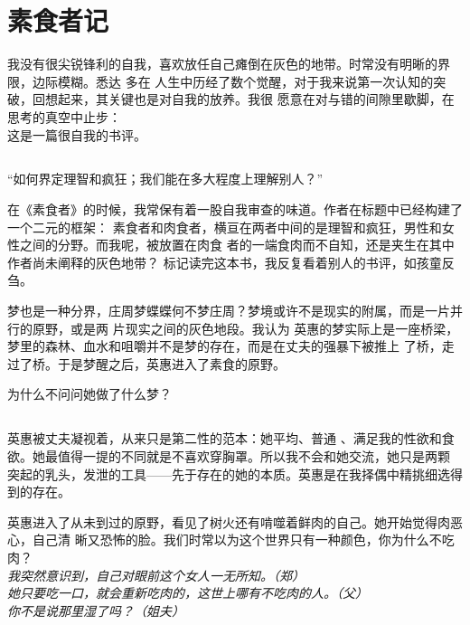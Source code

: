 \documentclass[a5paper, twoside]{article}
\let\oldemph\emph
\renewcommand{\emph}[1]{{\oldemph{#1}}}
\begin{document}
\vspace{-0.8cm}

\newpage

\section{素食者记}

我没有很尖锐锋利的自我，喜欢放任自己瘫倒在灰色的地带。时常没有明晰的界限，边际模糊。悉达
多在
人生中历经了数个觉醒，对于我来说第一次认知的突破，回想起来，其关键也是对自我的放养。我很
愿意在对与错的间隙里歇脚，在思考的真空中止步：\\这是一篇很自我的书评。

\subsection{}

“如何界定理智和疯狂；我们能在多大程度上理解别人？”

在《素食者》的时候，我常保有着一股自我审查的味道。作者在标题中已经构建了一个二元的框架：
素食者和肉食者，横亘在两者中间的是理智和疯狂，男性和女性之间的分野。而我呢，被放置在肉食
者的一端食肉而不自知，还是夹生在其中作者尚未阐释的灰色地带？
标记读完这本书，我反复看着别人的书评，如孩童反刍。

梦也是一种分界，庄周梦蝶蝶何不梦庄周？梦境或许不是现实的附属，而是一片并行的原野，或是两
片现实之间的灰色地段。我认为
英惠的梦实际上是一座桥梁，梦里的森林、血水和咀嚼并不是梦的存在，而是在丈夫的强暴下被推上
了桥，走过了桥。于是梦醒之后，英惠进入了素食的原野。

为什么不问问她做了什么梦？

\subsection{}

英惠被丈夫凝视着，从来只是第二性的范本：她平均、普通
、满足我的性欲和食欲。她最值得一提的不同就是不喜欢穿胸罩。所以我不会和她交流，她只是两颗
突起的乳头，发泄的工具——先于存在的她的本质。英惠是在我择偶中精挑细选得到的存在。

英惠进入了从未到过的原野，看见了树火还有啃噬着鲜肉的自己。她开始觉得肉恶心，自己清
晰又恐怖的脸。我们时常以为这个世界只有一种颜色，你为什么不吃肉？
\\\emph{我突然意识到，自己对眼前这个女人一无所知。（郑）}
\\\emph{她只要吃一口，就会重新吃肉的，这世上哪有不吃肉的人。（父）}
\\\emph{你不是说那里湿了吗？（姐夫）}
\end{document}
